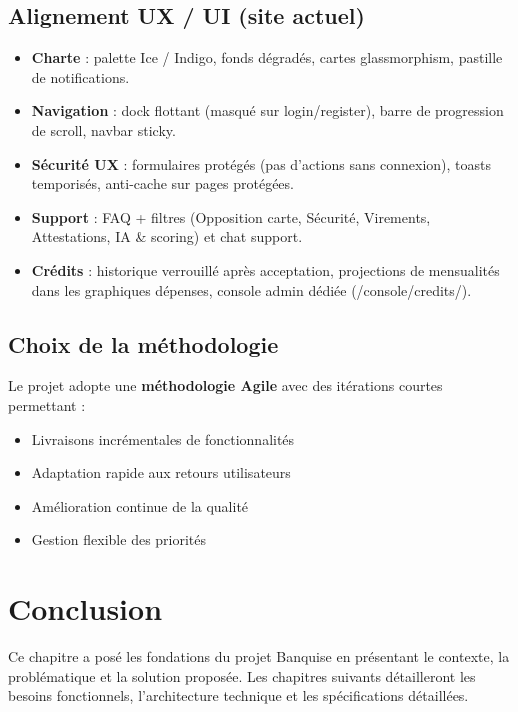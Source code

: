 \documentclass[12pt,a4paper]{report}
\begin{document}
\subsection{Alignement UX / UI (site actuel)}
\begin{itemize}[leftmargin=1.5cm]
    \item \textbf{Charte} : palette Ice / Indigo, fonds dégradés, cartes glassmorphism, pastille de notifications.
    \item \textbf{Navigation} : dock flottant (masqué sur login/register), barre de progression de scroll, navbar sticky.
    \item \textbf{Sécurité UX} : formulaires protégés (pas d'actions sans connexion), toasts temporisés, anti-cache sur pages protégées.
    \item \textbf{Support} : FAQ + filtres (Opposition carte, Sécurité, Virements, Attestations, IA \& scoring) et chat support.
    \item \textbf{Crédits} : historique verrouillé après acceptation, projections de mensualités dans les graphiques dépenses, console admin dédiée (/console/credits/).
\end{itemize}

\subsection{Choix de la méthodologie}
Le projet adopte une \textbf{méthodologie Agile} avec des itérations courtes permettant :
\begin{itemize}[leftmargin=1.5cm]
    \item Livraisons incrémentales de fonctionnalités
    \item Adaptation rapide aux retours utilisateurs
    \item Amélioration continue de la qualité
    \item Gestion flexible des priorités
\end{itemize}

\section{Conclusion}
Ce chapitre a posé les fondations du projet Banquise en présentant le contexte, la problématique et la solution proposée. Les chapitres suivants détailleront les besoins fonctionnels, l'architecture technique et les spécifications détaillées.

\end{document}
